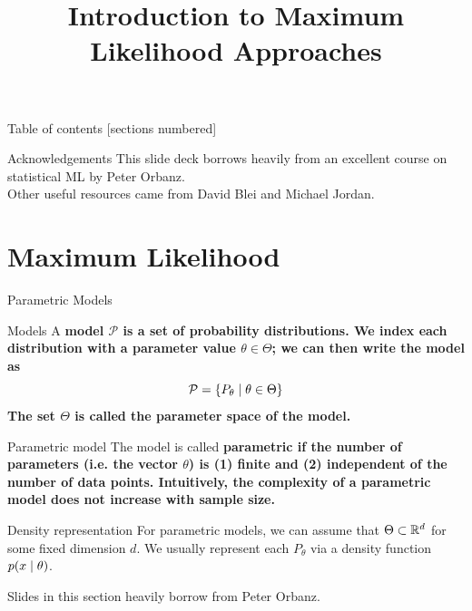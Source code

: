 \documentclass[10pt]{beamer}
\title{Introduction to Maximum Likelihood Approaches}
\begin{document}
\maketitle

\begin{frame}{Table of contents}
  [sections numbered]
  \tableofcontents[hideallsubsections]
\end{frame}

\begin{frame}{Acknowledgements}
This slide deck borrows heavily from an excellent course on statistical ML by Peter Orbanz.  \\
\vfill
Other useful resources came from David Blei and Michael Jordan.
\end{frame}


\section{Maximum Likelihood}

\begin{frame}{Parametric Models}

\begin{sblock}{Models}
A \bf{model} $\mathcal{P}$ is a set of probability distributions.  We index each distribution with a parameter value $\theta \in \Theta$; we can then write the model as
\[ \mathcal{P} = \{ {P_\theta \; | \; \theta \in \Theta} \} \]
The set $\Theta$ is called the \bf{parameter space} of the model.
\end{sblock}

\begin{sblock}{Parametric model}
The model is called \bf{parametric} if the number of parameters (i.e. the vector $\theta$) is (1) finite and (2) independent of the number of data points.   Intuitively, the complexity of a parametric model does not increase with sample size.
\end{sblock}


\begin{sblock}{Density representation}
For parametric models, we can assume that $\Theta \subset \mathbb{R}^d$ for some fixed dimension $d$.   We usually represent each $P_\theta$ via a density function $p(x \; | \; \theta)$.
\end{sblock}
\hfill \tiny Slides in this section heavily borrow from Peter Orbanz.
\end{frame}
\end{document}
